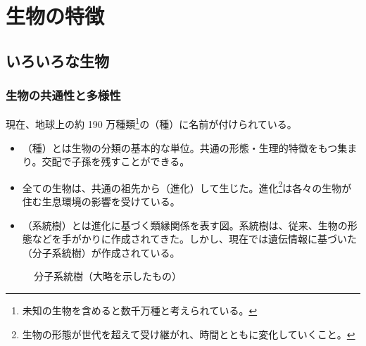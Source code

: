 \chapter{生物の特徴}
\section{いろいろな生物}
\subsection{生物の共通性と多様性}
現在、地球上の約 190 万種類\footnote{未知の生物を含めると数千万種と考えられている。}の（\textcolor{black!10}{種}）に名前が付けられている。
\begin{itemize}\setlength{\leftskip}{-1.00zw}%
\item[\ajMaru{1}]（\textcolor{black!10}{種}）とは生物の分類の基本的な単位。共通の形態・生理的特徴をもつ集まり。交配で子孫を残すことができる。
\item[\ajMaru{2}] 全ての生物は、共通の祖先から（\textcolor{black!10}{進化}）して生じた。進化\footnote{生物の形態が世代を超えて受け継がれ、時間とともに変化していくこと。}は各々の生物が住む生息環境の影響を受けている。
\item[\ajMaru{3}]（\textcolor{black!10}{系統樹}）とは進化に基づく類縁関係を表す図。系統樹は、従来、生物の形態などを手がかりに作成されてきた。しかし、現在では遺伝情報に基づいた（\textcolor{black!10}{分子系統樹}）が作成されている。
\end{itemize}
\vspc{-5.00pt}\begin{figure}[H]\centering{}\caption{分子系統樹（大略を示したもの）}\label{分子系統樹}\end{figure}
